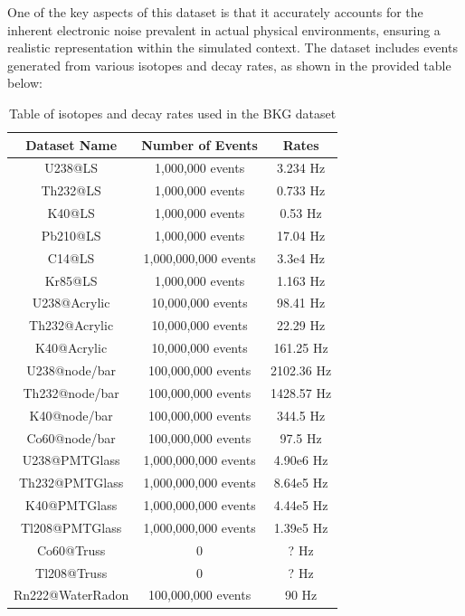 One of the key aspects of this dataset is that it accurately accounts for the inherent electronic noise prevalent in actual physical environments, ensuring a realistic representation within the simulated context. The dataset includes events generated from various isotopes and decay rates, as shown in the provided table below:

\begin{table}[htp]
	\centering
	\small
	\begin{tabular}{ccc}
		\toprule
		\textbf{Dataset Name}  & \textbf{Number of Events}  & \textbf{Rates}   \\\midrule
		U238@LS      &   1,000,000 events    &           3.234 Hz            \\
		Th232@LS      &   1,000,000 events    &           0.733 Hz            \\
		K40@LS       &   1,000,000 events    &           0.53 Hz             \\
		Pb210@LS      &   1,000,000 events    &           17.04 Hz            \\
		C14@LS       & 1,000,000,000 events  &           3.3e4 Hz            \\
		Kr85@LS      &   1,000,000 events    &           1.163 Hz            \\
		U238@Acrylic    &   10,000,000 events   &           98.41 Hz            \\
		Th232@Acrylic   &   10,000,000 events   &           22.29 Hz            \\
		
		
		K40@Acrylic    &   10,000,000 events   &          161.25 Hz            \\
		U238@node/bar   &  100,000,000 events   &          2102.36 Hz           \\
		Th232@node/bar   &  100,000,000 events   &          1428.57 Hz           \\
		K40@node/bar    &  100,000,000 events   &           344.5 Hz            \\
		Co60@node/bar   &  100,000,000 events   &           97.5 Hz             \\
		U238@PMTGlass   & 1,000,000,000 events  &          4.90e6 Hz            \\
		Th232@PMTGlass   & 1,000,000,000 events  &          8.64e5 Hz            \\
		K40@PMTGlass    & 1,000,000,000 events  &          4.44e5 Hz            \\
		Tl208@PMTGlass   & 1,000,000,000 events  &          1.39e5 Hz            \\
		Co60@Truss     &           0           &             ? Hz              \\
		Tl208@Truss    &           0           &             ? Hz              \\
		Rn222@WaterRadon  &  100,000,000 events   &            90 Hz              \\
		\bottomrule
	\end{tabular}
	\caption{Table of isotopes and decay rates used in the BKG dataset}
	\label{tab:BKG_gen}
\end{table}


